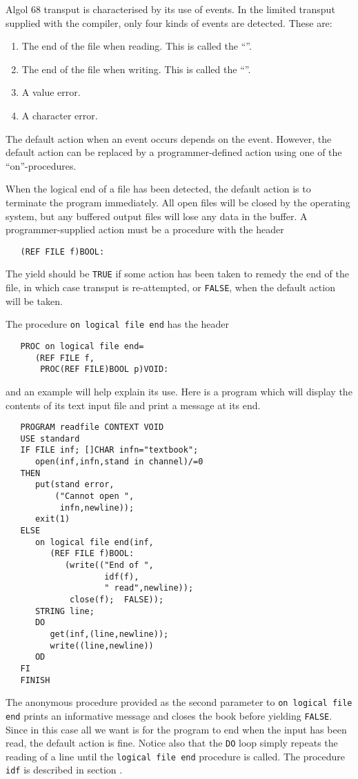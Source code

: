 Algol 68 transput is characterised by its use of events. In the
limited transput supplied with the
 compiler,
only four kinds of events are detected. These are:
\begin{enumerate}
\item The end of the file when reading. This is called the
``''.
\item The end of the file when writing. This is called the
``''.
\item A value error.
\item A character error.
\end{enumerate}
The default action when an event occurs depends on the event.
However, the default action can be replaced by a programmer-defined
action using one of the ``on''-proced\-ures.

When the logical end of a file has been detected, the default action
is to terminate the program immediately. All open files will be
closed by the operating system, but any buffered output files will
lose any data in the buffer. A programmer-supplied action must be a
procedure with the header
\begin{verbatim}
   (REF FILE f)BOOL:
\end{verbatim}
\noindent
The yield should be \verb|TRUE| if some action has been taken to
remedy the end of the file, in which case transput is re-attempted,
or \verb|FALSE|, when the default action will be taken.

The procedure \verb|on logical file end| has the header
\begin{verbatim}
   PROC on logical file end=
      (REF FILE f,
       PROC(REF FILE)BOOL p)VOID:
\end{verbatim}
\noindent
and an example will help explain its use. Here is a program which
will display the contents of its text input file and print a message
at its end.
\begin{verbatim}
   PROGRAM readfile CONTEXT VOID
   USE standard
   IF FILE inf; []CHAR infn="textbook";
      open(inf,infn,stand in channel)/=0
   THEN
      put(stand error,
          ("Cannot open ",
           infn,newline));
      exit(1)
   ELSE
      on logical file end(inf,
         (REF FILE f)BOOL:
            (write(("End of ",
                    idf(f),
                    " read",newline));
             close(f);  FALSE));
      STRING line;
      DO
         get(inf,(line,newline));
         write((line,newline))
      OD
   FI
   FINISH
\end{verbatim}
\noindent
The anonymous procedure provided as the second parameter to
\verb|on logical file end| prints an informative message and closes
the book before yielding \verb|FALSE|. Since in this case all we want
is for the program to end when the input has been read, the default
action is fine. Notice also that the \verb|DO| loop simply repeats
the reading of a line until the \verb|logical file end| procedure is
called. The procedure \verb|idf| is described in section
.

